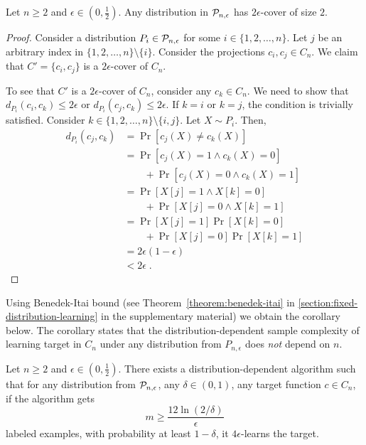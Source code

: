 \begin{lemma}
Let $n \ge 2$ and $\epsilon \in (0,\frac{1}{2})$. Any distribution in $\P_{n,\epsilon}$
has $2\epsilon$-cover of size $2$.
\end{lemma}

\begin{proof}
Consider a distribution $P_i \in \P_{n,\epsilon}$ for some $i \in \{1,2,\dots,n\}$.
Let $j$ be an arbitrary index in $\{1,2,\dots,n\} \setminus \{i\}$.
Consider the projections $c_i, c_j \in C_n$. We claim that $C' = \{c_i, c_j\}$
is a $2\epsilon$-cover of $C_n$.

To see that $C'$ is a $2\epsilon$-cover of $C_n$, consider any $c_k \in C_n$.
We need to show that $d_{P_i}(c_i, c_k) \le 2\epsilon$ or $d_{P_i}(c_j, c_k)
\le 2\epsilon$. If $k = i$ or $k = j$, the condition is trivially satisfied.
Consider $k \in \{1,2,\dots,n\} \setminus \{i,j\}$. Let $X \sim P_i$. Then,
\begin{align*}
d_{P_i}(c_j, c_k)
& = \Pr[c_j(X) \neq c_k(X)] \\
& = \Pr[c_j(X) = 1 \wedge c_k(X) = 0] \\
  & \qquad + \Pr[c_j(X) = 0 \wedge c_k(X) = 1] \\
& = \Pr[X[j] = 1 \wedge X[k] = 0]  \\
  & \qquad + \Pr[X[j] = 0 \wedge X[k] = 1] \\
& = \Pr[X[j] = 1] \Pr[X[k] = 0] \\
  & \qquad + \Pr[X[j] = 0] \Pr[X[k] = 1] \\
& = 2 \epsilon \left( 1 - \epsilon \right)  \\
& < 2 \epsilon \; .
\end{align*}
\end{proof}

Using Benedek-Itai bound (see Theorem~\ref{theorem:benedek-itai} in
\autoref{section:fixed-distribution-learning} in
the supplementary material) we obtain the corollary below.
The corollary states that the distribution-dependent sample complexity
of learning target in $C_n$ under any distribution from $P_{n,\epsilon}$
does \emph{not} depend on $n$.

\begin{corollary}
Let $n \ge 2$ and $\epsilon \in (0,\frac{1}{2})$.  There exists a
distribution-dependent algorithm such that for any distribution from $\P_{n,\epsilon}$,
any $\delta \in (0,1)$, any target function $c \in C_n$, if the algorithm gets
$$
m \ge \frac{12\ln(2/\delta)}{\epsilon}
$$
labeled examples, with
probability at least $1 - \delta$, it $4\epsilon$-learns the target.
\end{corollary}


